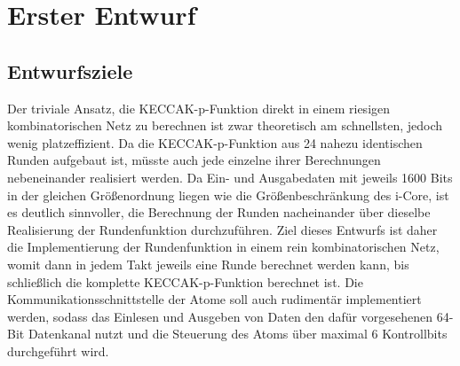 \section{Erster Entwurf}
\subsection{Entwurfsziele}
Der triviale Ansatz, die KECCAK-p-Funktion direkt in einem riesigen kombinatorischen Netz zu berechnen ist zwar theoretisch am schnellsten,
jedoch wenig platzeffizient. Da die KECCAK-p-Funktion aus 24 nahezu identischen Runden aufgebaut ist, müsste auch jede einzelne
ihrer Berechnungen nebeneinander realisiert werden. Da Ein- und Ausgabedaten mit jeweils 1600 Bits in der gleichen Größenordnung liegen
wie die Größenbeschränkung des i-Core, ist es deutlich sinnvoller, die Berechnung der Runden nacheinander über dieselbe Realisierung der Rundenfunktion durchzuführen.
Ziel dieses Entwurfs ist daher die Implementierung der Rundenfunktion in einem rein kombinatorischen Netz, womit dann in jedem Takt
jeweils eine Runde berechnet werden kann, bis schließlich die komplette KECCAK-p-Funktion berechnet ist. Die Kommunikationsschnittstelle
der Atome soll auch rudimentär implementiert werden, sodass das Einlesen und Ausgeben von Daten den dafür vorgesehenen 64-Bit Datenkanal nutzt
und die Steuerung des Atoms über maximal 6 Kontrollbits durchgeführt wird.

